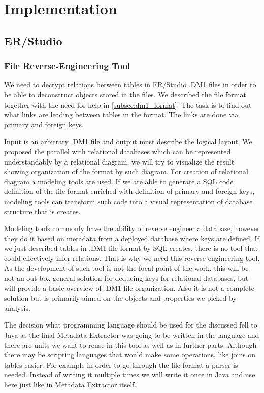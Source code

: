 \chapter{Implementation}


\section{ER/Studio}

\subsection{File Reverse-Engineering Tool}
\label{subsec:dm1_tool}

We need to decrypt relations between tables in ER/Studio .DM1 files in order to be able to deconstruct objects stored in the files. 
We described the file format together with the need for help in \autoref{subsec:dm1_format}.
The task is to find out what links are leading between tables in the format. The links are done via primary and foreign keys.

Input is an arbitrary .DM1 file and output must describe the logical layout. 
We proposed the parallel with relational databases which can be represented understandably by a relational diagram, we will try to visualize the result showing organization of the format by such diagram. 
For creation of relational diagram a modeling tools are used. 
If we are able to generate a SQL code definition of the file format enriched with definition of primary and foreign keys, modeling tools can transform such code into a visual representation of database structure that is creates.

Modeling tools commonly have the ability of reverse engineer a database, however they do it based on metadata from a deployed database where keys are defined. 
If we just described tables in .DM1 file format by SQL creates, there is no tool that could effectively infer relations. That is why we need this reverse-engineering tool.
As the development of such tool is not the focal point of the work, this will be not an out-box general solution for deducing keys for relational databases, but will provide a basic overview of .DM1 file organization. Also it is not a complete solution but is primarily aimed on the objects and properties we picked by analysis. 

The decision what programming language should be used for the discussed fell to Java as the final Metadata Extractor was going to be written in the language and there are units we want to reuse in this tool as well as in further parts. Although there may be scripting languages that would make some operations, like joins on tables easier.
For example in order to go through the file format a parser is needed. Instead of writing it multiple times we will write it once in Java and use here just like in Metadata Extractor itself. \\

